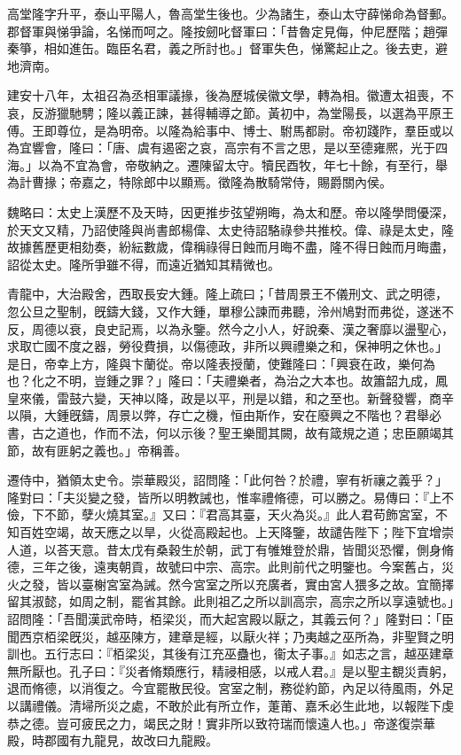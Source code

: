
\begin{pinyinscope}
高堂隆字升平，泰山平陽人，魯高堂生後也。少為諸生，泰山太守薛悌命為督郵。郡督軍與悌爭論，名悌而呵之。隆按劒叱督軍曰：「昔魯定見侮，仲尼歷階；趙彈秦箏，相如進缶。臨臣名君，義之所討也。」督軍失色，悌驚起止之。後去吏，避地濟南。

建安十八年，太祖召為丞相軍議掾，後為歷城侯徽文學，轉為相。徽遭太祖喪，不哀，反游獵馳騁；隆以義正諫，甚得輔導之節。黃初中，為堂陽長，以選為平原王傅。王即尊位，是為明帝。以隆為給事中、博士、駙馬都尉。帝初踐阼，羣臣或以為宜響會，隆曰：「唐、虞有遏密之哀，高宗有不言之思，是以至德雍熈，光于四海。」以為不宜為會，帝敬納之。遷陳留太守。犢民酉牧，年七十餘，有至行，舉為計曹掾；帝嘉之，特除郎中以顯焉。徵隆為散騎常侍，賜爵關內侯。

魏略曰：太史上漢歷不及天時，因更推步弦望朔晦，為太和歷。帝以隆學問優深，於天文又精，乃詔使隆與尚書郎楊偉、太史待詔駱祿參共推校。偉、祿是太史，隆故據舊歷更相劾奏，紛紜數歲，偉稱祿得日蝕而月晦不盡，隆不得日蝕而月晦盡，詔從太史。隆所爭雖不得，而遠近猶知其精微也。

青龍中，大治殿舍，西取長安大鍾。隆上疏曰；「昔周景王不儀刑文、武之明德，忽公旦之聖制，旣鑄大錢，又作大鍾，單穆公諫而弗聽，泠州鳩對而弗從，遂迷不反，周德以衰，良史記焉，以為永鑒。然今之小人，好說秦、漢之奢靡以盪聖心，求取亡國不度之器，勞役費損，以傷德政，非所以興禮樂之和，保神明之休也。」是日，帝幸上方，隆與卞蘭從。帝以隆表授蘭，使難隆曰：「興衰在政，樂何為也？化之不明，豈鍾之罪？」隆曰：「夫禮樂者，為治之大本也。故簫韶九成，鳳皇來儀，雷鼓六變，天神以降，政是以平，刑是以錯，和之至也。新聲發響，商辛以隕，大鍾旣鑄，周景以弊，存亡之機，恒由斯作，安在廢興之不階也？君舉必書，古之道也，作而不法，何以示後？聖王樂聞其闕，故有箴規之道；忠臣願竭其節，故有匪躬之義也。」帝稱善。

遷侍中，猶領太史令。崇華殿災，詔問隆：「此何咎？於禮，寧有祈禳之義乎？」隆對曰：「夫災變之發，皆所以明教誡也，惟率禮脩德，可以勝之。易傳曰：『上不儉，下不節，孽火燒其室。』又曰：『君高其臺，天火為災。』此人君苟飾宮室，不知百姓空竭，故天應之以旱，火從高殿起也。上天降鑒，故譴告陛下；陛下宜增崇人道，以荅天意。昔太戊有桑穀生於朝，武丁有雊雉登於鼎，皆聞災恐懼，側身脩德，三年之後，遠夷朝貢，故號曰中宗、高宗。此則前代之明鑒也。今案舊占，災火之發，皆以臺榭宮室為誡。然今宮室之所以充廣者，實由宮人猥多之故。宜簡擇留其淑懿，如周之制，罷省其餘。此則祖乙之所以訓高宗，高宗之所以享遠號也。」詔問隆：「吾聞漢武帝時，栢梁災，而大起宮殿以厭之，其義云何？」隆對曰：「臣聞西京栢梁旣災，越巫陳方，建章是經，以厭火祥；乃夷越之巫所為，非聖賢之明訓也。五行志曰：『栢梁災，其後有江充巫蠱也，衞太子事。』如志之言，越巫建章無所厭也。孔子曰：『災者脩類應行，精祲相感，以戒人君。』是以聖主覩災責躬，退而脩德，以消復之。今宜罷散民役。宮室之制，務從約節，內足以待風雨，外足以講禮儀。清埽所災之處，不敢於此有所立作，萐莆、嘉禾必生此地，以報陛下虔恭之德。豈可疲民之力，竭民之財！實非所以致符瑞而懷遠人也。」帝遂復崇華殿，時郡國有九龍見，故改曰九龍殿。


\end{pinyinscope}
